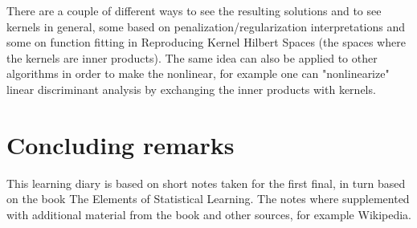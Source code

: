 \documentclass[a4paper, 12pt]{scrartcl}
\begin{document}
There are a couple of different ways to see the resulting solutions and to see kernels in general, some based on penalization/regularization interpretations and some on function fitting in Reproducing Kernel Hilbert Spaces (the spaces where the kernels are inner products).
The same idea can also be applied to other algorithms in order to make the nonlinear, for example one can "nonlinearize" linear discriminant analysis by exchanging the inner products with kernels.

\section*{Concluding remarks}
This learning diary is based on short notes taken for the first final, in turn based on the book The Elements of Statistical Learning.
The notes where supplemented with additional material from the book and other sources, for example Wikipedia.
\end{document}
